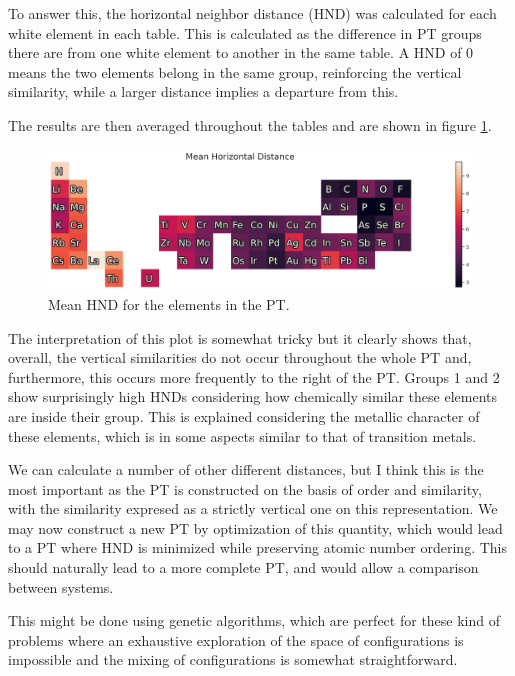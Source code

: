 \documentclass[]{article}
\begin{document}
To answer this, the horizontal neighbor distance (HND) was calculated for each white element in each table. This is calculated as the difference in PT groups there are from one white element to another in the same table. A HND of 0 means the two elements belong in the same group, reinforcing the vertical similarity, while a larger distance implies a departure from this.

The results are then averaged throughout the tables and are shown in figure \ref{fig:fig2}.

\begin{figure}[h!]
  \centering
	\includegraphics[width=14.0cm]{meanHND.png}
	\caption{Mean HND for the elements in the PT.}
	\label{fig:fig2}
\end{figure}

The interpretation of this plot is somewhat tricky but it clearly shows that, overall, the vertical similarities do not occur throughout the whole PT and, furthermore, this occurs more frequently to the right of the PT. Groups 1 and 2 show surprisingly high HNDs considering how chemically similar these elements are inside their group. This is explained considering the metallic character of these elements, which is in some aspects similar to that of transition metals.

We can calculate a number of other different distances, but I think this is the most important as the PT is constructed on the basis of order and similarity, with the similarity expresed as a strictly vertical one on this representation. We may now construct a new PT by optimization of this quantity, which would lead to a PT where HND is minimized while preserving atomic number ordering. This should naturally lead to a more complete PT, and would allow a comparison between systems.

This might be done using genetic algorithms, which are perfect for these kind of problems where an exhaustive exploration of the space of configurations is impossible and the mixing of configurations is somewhat straightforward.
\end{document}
